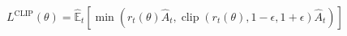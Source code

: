 \documentclass[preview]{standalone}
\begin{document}
\begin{align*}
L^{\text{CLIP}}(\theta)=\hat{\mathbb{E}}_t\left[\min \left(r_t(\theta) \hat{A}_t, \operatorname{clip}\left(r_t(\theta), 1-\epsilon, 1+\epsilon\right) \hat{A}_t\right)\right]
\end{align*}
\end{document}

